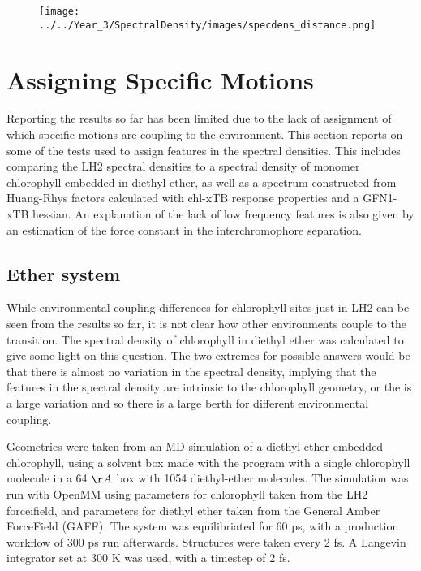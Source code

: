 \begin{figure}
    \centering
    \texttt{[image: ../../Year\_3/SpectralDensity/images/specdens\_distance.png]}
\end{figure}

\afterpartskip
\section{Assigning Specific Motions}
\label{sec:monomer_dimer_assign}

Reporting the results so far has been limited due to the lack of assignment of which
specific motions are coupling to the environment. This section reports on some of
the tests used to assign features in the spectral densities. This includes comparing
the LH2 spectral densities to a spectral density of monomer chlorophyll embedded
in diethyl ether, as well as a spectrum constructed from Huang-Rhys factors calculated
with chl-xTB response properties and a GFN1-xTB hessian. An explanation of the 
lack of low frequency features is also given by an estimation of the force constant
in the interchromophore separation.

\subsection{Ether system}
\label{subsec:specdens_ether}

While environmental coupling differences for chlorophyll sites just in LH2 can be
seen from the results so far, it is not clear how other environments couple to the 
\Qy transition. The spectral density of chlorophyll in diethyl ether was calculated
to give some light on this question. The two extremes for possible answers would
be that there is almost no variation in the spectral density, implying that the 
features in the spectral density are intrinsic to the chlorophyll geometry, or the
is a large variation and so there is a large berth for different environmental coupling. 

Geometries were taken from an MD simulation of a diethyl-ether embedded chlorophyll, 
using a solvent box made with the  program with a single chlorophyll 
molecule in a 64 $\AA{}$ box with 1054 diethyl-ether molecules. The simulation was
run with OpenMM using parameters for chlorophyll taken from the LH2 forceifield,
and parameters for diethyl ether taken from the General Amber ForceField (GAFF).
The system was equilibriated for 60 ps, with a production workflow of 300 ps run 
afterwards. Structures were taken every 2 fs. A Langevin integrator set at 300 K
was used, with a timestep of 2 fs.

